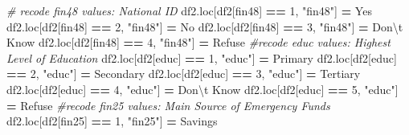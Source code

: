 \documentclass[water,article,submit,moreauthors,pdftex]{mdpi}
\newenvironment{Shaded}{\begin{snugshade}}{\end{snugshade}}
\newcommand{\CharTok}[1]{\textcolor[rgb]{0.31,0.60,0.02}{#1}}
\newcommand{\CommentTok}[1]{\textcolor[rgb]{0.56,0.35,0.01}{\textit{#1}}}
\newcommand{\DecValTok}[1]{\textcolor[rgb]{0.00,0.00,0.81}{#1}}
\newcommand{\NormalTok}[1]{#1}
\newcommand{\OperatorTok}[1]{\textcolor[rgb]{0.81,0.36,0.00}{\textbf{#1}}}
\newcommand{\StringTok}[1]{\textcolor[rgb]{0.31,0.60,0.02}{#1}}
\begin{document}
\begin{Shaded}
\begin{Highlighting}[]
\CommentTok{\# recode fin48 values: National ID}
\NormalTok{df2.loc[df2[}\StringTok{\textquotesingle{}fin48\textquotesingle{}}\NormalTok{] }\OperatorTok{==} \DecValTok{1}\NormalTok{, }\StringTok{"fin48"}\NormalTok{] }\OperatorTok{=} \StringTok{\textquotesingle{}Yes\textquotesingle{}}
\NormalTok{df2.loc[df2[}\StringTok{\textquotesingle{}fin48\textquotesingle{}}\NormalTok{] }\OperatorTok{==} \DecValTok{2}\NormalTok{, }\StringTok{"fin48"}\NormalTok{] }\OperatorTok{=} \StringTok{\textquotesingle{}No\textquotesingle{}}
\NormalTok{df2.loc[df2[}\StringTok{\textquotesingle{}fin48\textquotesingle{}}\NormalTok{] }\OperatorTok{==} \DecValTok{3}\NormalTok{, }\StringTok{"fin48"}\NormalTok{] }\OperatorTok{=} \StringTok{\textquotesingle{}Don}\CharTok{\textbackslash{}\textquotesingle{}}\StringTok{t Know\textquotesingle{}}
\NormalTok{df2.loc[df2[}\StringTok{\textquotesingle{}fin48\textquotesingle{}}\NormalTok{] }\OperatorTok{==} \DecValTok{4}\NormalTok{, }\StringTok{"fin48"}\NormalTok{] }\OperatorTok{=} \StringTok{\textquotesingle{}Refuse\textquotesingle{}}
\CommentTok{\#recode educ values: Highest Level of Education}
\NormalTok{df2.loc[df2[}\StringTok{\textquotesingle{}educ\textquotesingle{}}\NormalTok{] }\OperatorTok{==} \DecValTok{1}\NormalTok{, }\StringTok{"educ"}\NormalTok{] }\OperatorTok{=} \StringTok{\textquotesingle{}Primary\textquotesingle{}}
\NormalTok{df2.loc[df2[}\StringTok{\textquotesingle{}educ\textquotesingle{}}\NormalTok{] }\OperatorTok{==} \DecValTok{2}\NormalTok{, }\StringTok{"educ"}\NormalTok{] }\OperatorTok{=} \StringTok{\textquotesingle{}Secondary\textquotesingle{}}
\NormalTok{df2.loc[df2[}\StringTok{\textquotesingle{}educ\textquotesingle{}}\NormalTok{] }\OperatorTok{==} \DecValTok{3}\NormalTok{, }\StringTok{"educ"}\NormalTok{] }\OperatorTok{=} \StringTok{\textquotesingle{}Tertiary\textquotesingle{}}
\NormalTok{df2.loc[df2[}\StringTok{\textquotesingle{}educ\textquotesingle{}}\NormalTok{] }\OperatorTok{==} \DecValTok{4}\NormalTok{, }\StringTok{"educ"}\NormalTok{] }\OperatorTok{=} \StringTok{\textquotesingle{}Don}\CharTok{\textbackslash{}\textquotesingle{}}\StringTok{t Know\textquotesingle{}}
\NormalTok{df2.loc[df2[}\StringTok{\textquotesingle{}educ\textquotesingle{}}\NormalTok{] }\OperatorTok{==} \DecValTok{5}\NormalTok{, }\StringTok{"educ"}\NormalTok{] }\OperatorTok{=} \StringTok{\textquotesingle{}Refuse\textquotesingle{}}
\CommentTok{\#recode fin25 values: Main Source of Emergency Funds}
\NormalTok{df2.loc[df2[}\StringTok{\textquotesingle{}fin25\textquotesingle{}}\NormalTok{] }\OperatorTok{==} \DecValTok{1}\NormalTok{, }\StringTok{"fin25"}\NormalTok{] }\OperatorTok{=} \StringTok{\textquotesingle{}Savings\textquotesingle{}}

\end{Highlighting}
\end{Shaded}
\end{document}
